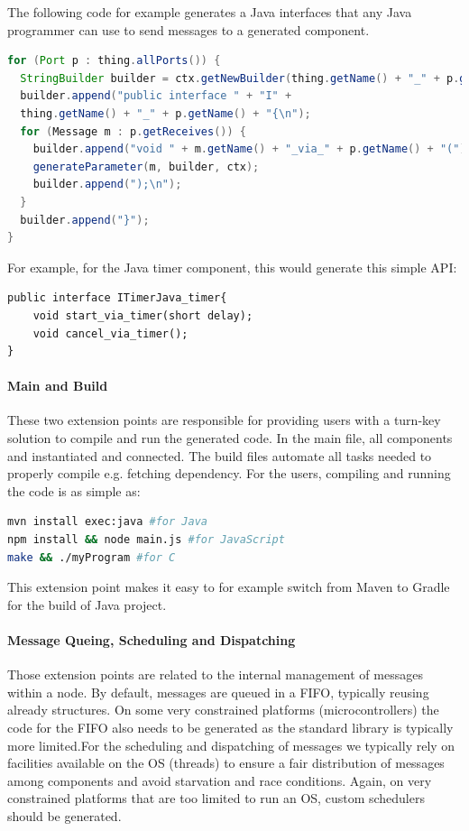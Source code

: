 The following code for example generates a Java interfaces that any Java programmer can use to send messages to a generated component. 

\begin{lstlisting}[language=Java]
for (Port p : thing.allPorts()) { 
  StringBuilder builder = ctx.getNewBuilder(thing.getName() + "_" + p.getName() + ".java"); 
  builder.append("public interface " + "I" +  
  thing.getName() + "_" + p.getName() + "{\n"); 
  for (Message m : p.getReceives()) { 
    builder.append("void " + m.getName() + "_via_" + p.getName() + "("); 
    generateParameter(m, builder, ctx); 
    builder.append(");\n"); 
  } 
  builder.append("}"); 
}
\end{lstlisting}

For example, for the Java timer component, this would generate this simple API: 


\begin{lstlisting}
public interface ITimerJava_timer{ 
	void start_via_timer(short delay); 
	void cancel_via_timer(); 
}
\end{lstlisting}

\paragraph{Main and Build}

These two extension points are responsible for providing users with a turn-key solution to compile and run the generated code. In the main file, all components and instantiated and connected. The build files automate all tasks needed to properly compile e.g. fetching dependency. For the users, compiling and running the code is as simple as: 

\begin{lstlisting}[language=bash]
mvn install exec:java #for Java 
npm install && node main.js #for JavaScript
make && ./myProgram #for C 
\end{lstlisting}

This extension point makes it easy to for example switch from Maven to Gradle for the build of Java project. 

\paragraph{Message Queing, Scheduling and Dispatching}

Those extension points are related to the internal management of messages within a node. By default, messages are queued in a FIFO, typically reusing already structures. On some very constrained platforms (microcontrollers) the code for the FIFO also needs to be generated as the standard library is typically more limited.For the scheduling and dispatching of messages we typically rely on facilities available on the OS (threads) to ensure a fair distribution of messages among components and avoid starvation and race conditions. Again, on very constrained platforms that are too limited to run an OS, custom schedulers should be generated.

